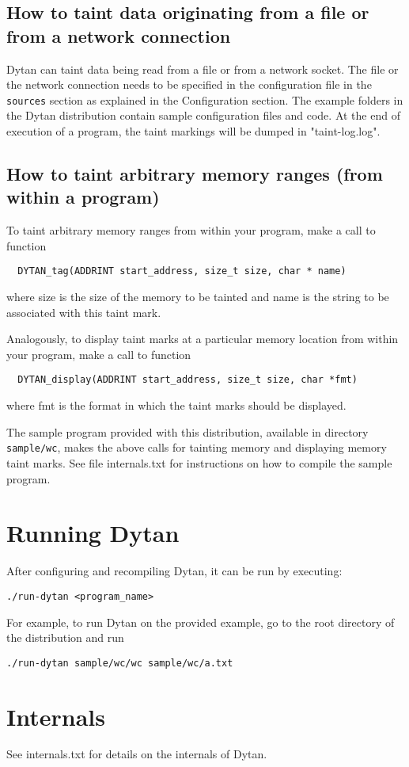 \documentclass[letterpaper,10pt]{article}
\begin{document}
\subsection{How to taint data originating from a file or from a network connection}

Dytan can taint data being read from a file or from a network socket.
The file or the network connection needs to be specified in the
configuration file in the \verb|sources| section as explained in the Configuration
section. The example folders in the Dytan distribution contain sample 
configuration files and code. At the end of execution of a program,
the taint markings will be dumped in "taint-log.log".


\subsection{How to taint arbitrary memory ranges (from within a program)}

To taint arbitrary memory ranges from within your program, make a call
to function
\begin{verbatim}
  DYTAN_tag(ADDRINT start_address, size_t size, char * name)
\end{verbatim}
where size is the size of the memory to be tainted and name is the
string to be associated with this taint mark.

Analogously, to display taint marks at a particular memory location
from within your program, make a call to function
\begin{verbatim}
  DYTAN_display(ADDRINT start_address, size_t size, char *fmt)
\end{verbatim}
where fmt is the format in which the taint marks should be displayed.

The sample program provided with this distribution, available in
directory \verb|sample/wc|, makes the above calls for tainting memory and
displaying memory taint marks.  See file internals.txt for
instructions on how to compile the sample program.


\section{Running Dytan}

After configuring and recompiling Dytan, it can be run by executing:
\begin{verbatim}
./run-dytan <program_name>
\end{verbatim}

For example, to run Dytan on the provided example, go to the root
directory of the distribution and run
\begin{verbatim}
./run-dytan sample/wc/wc sample/wc/a.txt
\end{verbatim}

\section{Internals}

See internals.txt for details on the internals of Dytan.
\end{document}
